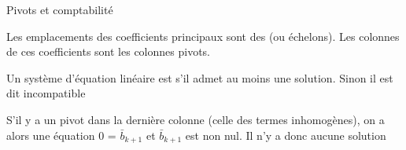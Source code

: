 \begin{parag}{Pivots et comptabilité}
    \begin{definition}
        Les emplacements des coefficients principaux sont des  (ou échelons). Les colonnes de ces coefficients sont les colonnes pivots.
    \end{definition}
    \begin{definition}
        Un système d'équation linéaire est  s'il admet au moins une solution. Sinon il est dit incompatible
    \end{definition}
    S'il y a un pivot dans la dernière colonne (celle des termes inhomogènes), on a alors une équation 0 = $\bar{b}_{k+1}$ et $\bar{b}_{k+1}$ est non nul. Il n'y a donc aucune solution
\end{parag}